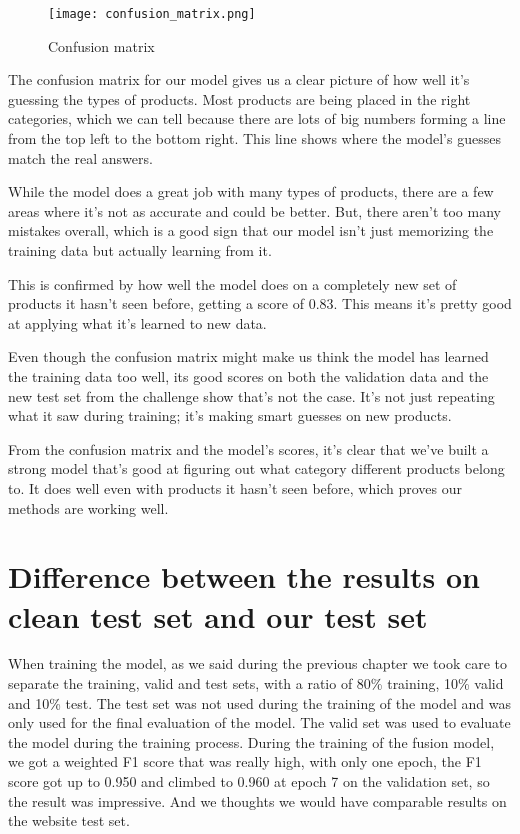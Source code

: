 \begin{figure}[H]
	\centering
	\texttt{[image: confusion\_matrix.png]}
	\caption{Confusion matrix}
	\label{fig:confusionmatrix}
\end{figure}

The confusion matrix for our model gives us a clear picture of how well it's guessing the types of products. Most products are being placed in the right categories, which we can tell because there are lots of big numbers forming a line from the top left to the bottom right. This line shows where the model's guesses match the real answers.

While the model does a great job with many types of products, there are a few areas where it's not as accurate and could be better. But, there aren't too many mistakes overall, which is a good sign that our model isn't just memorizing the training data but actually learning from it.

This is confirmed by how well the model does on a completely new set of products it hasn't seen before, getting a score of 0.83. This means it's pretty good at applying what it's learned to new data.

Even though the confusion matrix might make us think the model has learned the training data too well, its good scores on both the validation data and the new test set from the challenge show that's not the case. It's not just repeating what it saw during training; it's making smart guesses on new products.

From the confusion matrix and the model's scores, it's clear that we've built a strong model that's good at figuring out what category different products belong to. It does well even with products it hasn't seen before, which proves our methods are working well.


\section{Difference between the results on clean test set and our test set}

When training the model, as  we said during the previous chapter we took care to separate the training, valid and test sets, with a ratio of 80\% training, 10\% valid and 10\% test. The test set was not used during the training of the model and was only used for the final evaluation of the model. The valid set was used to evaluate the model during the training process. During the training of the fusion model, we got a weighted F1 score that was really high, with only one epoch, the F1 score got up to 0.950 and climbed to 0.960 at epoch 7 on the validation set, so the result was impressive. And we thoughts we would have comparable results on the website test set.


